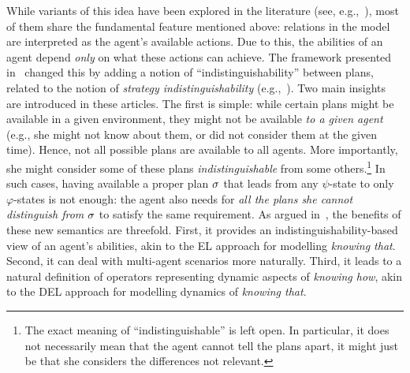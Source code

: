 While variants of this idea have been explored in the literature (see, e.g.,~\cite{Li17,LiWang17,FervariHLW17,Wang19a}),
most of them share the fundamental feature mentioned above: relations in the model are interpreted as the agent's available actions. Due to this, the abilities of an agent depend \emph{only} on what these actions can achieve. The framework presented in~\cite{AFSVQ21,AFSVQ23report} changed this by adding a notion of ``indistinguishability'' between plans, related to the notion of \emph{strategy indistinguishability} (e.g.,~\cite{JamrogaH04,Belardinelli14}). Two main insights are introduced in these articles. The first is simple: while certain plans might be available in a given environment, they might not be available \emph{to a given agent} (e.g., she might not know about them, or did not consider them at the given time). Hence, not all possible plans are available to all agents.  More importantly, she might consider some of these plans \emph{indistinguishable} from some others.\footnote{The exact meaning of ``indistinguishable'' is left open. In particular, it does not necessarily mean that the agent cannot tell the plans apart, it might just be that she considers the differences not relevant.} In such cases, having available a proper plan $\sigma$ that leads from any $\psi$-state to only $\varphi$-states is not enough: the agent also needs for \emph{all the plans she cannot distinguish from $\sigma$} to satisfy the same requirement. As argued in~\cite{AFSVQ21}, the benefits of these new semantics are threefold. First, it provides an indistinguishability-based view of an agent's abilities, akin to the EL approach for modelling \emph{knowing that}. Second, it can deal with multi-agent scenarios more naturally. Third, it leads to a natural definition of operators representing dynamic aspects of \emph{knowing how}, akin to the DEL approach for modelling dynamics of \emph{knowing that}.
%
